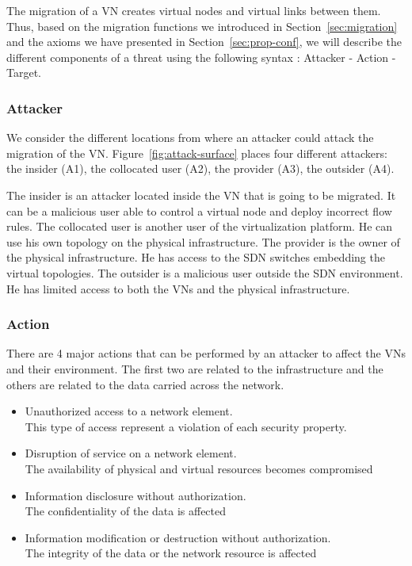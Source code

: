 

\label{sec:attacker-model}
The migration of a VN creates virtual nodes and virtual links between them.
Thus, based on  the migration functions we introduced in Section~\ref{sec:migration} and the axioms we have presented in Section~\ref{sec:prop-conf}, we will describe the different components of a threat using the following syntax
: Attacker - Action - Target.

\subsubsection{Attacker}
We consider the different locations from where an attacker could attack the migration of the VN. 
Figure~\ref{fig:attack-surface} places four different attackers: the insider (A1), the collocated user (A2), the provider (A3), the outsider (A4).

The insider is an attacker located inside the VN that is going to be migrated.
It can be a malicious user able to control a virtual node and deploy incorrect flow rules.
The collocated user is another user of the virtualization platform.
He can use his own topology on the physical infrastructure.
The provider is the owner of the physical infrastructure.
He has access to the SDN switches embedding the virtual topologies.
The outsider is a malicious user outside the SDN environment.
He has limited access to both the VNs and the physical infrastructure.

\subsubsection{Action}
There are 4 major actions that can be performed by an attacker to affect the VNs and their environment.
The first two are related to the infrastructure and the others are related to the data carried across the network.
\begin{itemize}
\item Unauthorized access to a network element.
\\ This type of access represent a violation of each security property.
\item Disruption of service on a network element.
\\ The availability of physical and virtual resources becomes compromised
\item Information disclosure without authorization.
\\ The confidentiality of the data is affected
\item Information modification or destruction without authorization.
\\ The integrity of the data or the network resource is affected
\end{itemize}

